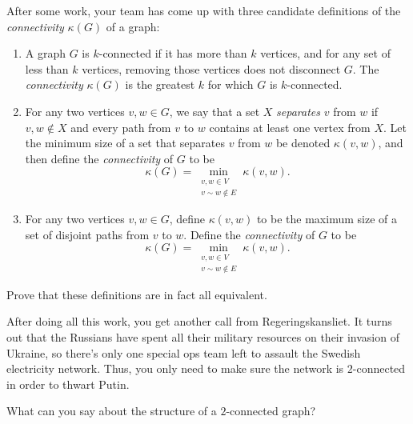 \documentclass[nobib]{tufte-handout}
\begin{document}
After some work, your team has come up with three candidate definitions of the \emph{connectivity} $\kappa(G)$ of a graph:
\begin{enumerate}
  \item A graph $G$ is $k$-connected if it has more than $k$ vertices, and for any set of less than $k$ vertices, removing those vertices does not disconnect $G$. The \emph{connectivity} $\kappa(G)$ is the greatest $k$ for which $G$ is $k$-connected.
  \item For any two vertices $v, w \in G$, we say that a set $X$ \emph{separates} $v$ from $w$ if $v, w \not\in X$ and every path from $v$ to $w$ contains at least one vertex from $X$. Let the minimum size of a set that separates $v$ from $w$ be denoted $\kappa(v,w)$, and then define the \emph{connectivity} of $G$ to be
  $$\kappa(G) = \min_{\substack{v, w \in V\\v\sim w \not\in E}} \kappa(v,w).$$
  \item For any two vertices $v, w \in G$, define $\kappa(v,w)$ to be the maximum size of a set of disjoint paths from $v$ to $w$. Define the \emph{connectivity} of $G$ to be
  $$\kappa(G) = \min_{\substack{v, w \in V\\v\sim w \not\in E}} \kappa(v,w).$$
\end{enumerate}

\begin{xca}
  Prove that these definitions are in fact all equivalent.
\end{xca}

After doing all this work, you get another call from Regeringskansliet. It turns out that the Russians have spent all their military resources on their invasion of Ukraine, so there's only one special ops team left to assault the Swedish electricity network. Thus, you only need to make sure the network is $2$-connected in order to thwart Putin.

\begin{xca}
  What can you say about the structure of a $2$-connected graph?
\end{xca}
%
%
\end{document}
